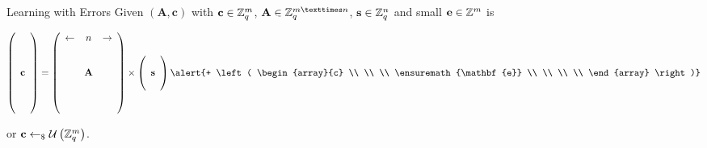 \documentclass[presentation,smaller]{beamer}
\newcommand{\ZZ}[1][blank]{\ensuremath{\ifthenelse{\equal{#1}{blank}}{\mathbb{Z}}{\mathbb{Z}\left[#1\right]}\xspace}}
\newcommand{\ZZq}[1][blank]{\ensuremath{\ifthenelse{\equal{#1}{blank}}{\mathbb{Z}_q}{\mathbb{Z}_q\left[#1\right]}\xspace}}
\renewcommand{\U}[1]{\ensuremath{\mathcal{U}\left( {#1} \right)}\xspace}
\renewcommand{\vec}[1]{\ensuremath{\mathbf{#1}}\xspace}
\newcommand{\sample}{\ensuremath{\leftarrow_{\$}}}
\begin{document}
\begin{frame}[label={sec:orgheadline7}]{Learning with Errors}
Given \((\vec{A},\vec{c})\) with \(\vec{c} \in \ZZq^{m}\), \(\vec{A} \in \ZZq^{m × n}\), \(\vec{s} \in \ZZq^{n}\) and \alert{small \(\vec{e} \in \ZZ^{m}\)} is

\[
\left(\begin{array}{c}
\\
\\
\\ 
\vec{c} \\
\\
\\
\\
\end{array} \right) = \left(
\begin{array}{ccc}
\leftarrow & n & \rightarrow \\
\\
\\ 
& \vec{A} & \\
\\
\\
\\
\end{array} \right) \times \left( \begin{array}{c}
\\
\vec{s} \\
\\
\end{array} \right) \alert{+ \left(
\begin{array}{c}
\\
\\
\\ 
\vec{e} \\
\\
\\
\\
\end{array} 
\right)}
\]

or \(\vec{c} \sample \U{\ZZq^{m}}\).
\end{frame}
\end{document}
